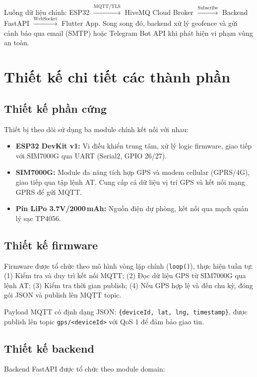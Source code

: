 \documentclass[../DoAn.tex]{subfiles}
\begin{document}
Luồng dữ liệu chính: ESP32 $\xrightarrow{\text{MQTT/TLS}}$ HiveMQ Cloud Broker $\xrightarrow{\text{Subscribe}}$ Backend FastAPI $\xrightarrow{\text{WebSocket}}$ Flutter App. Song song đó, backend xử lý geofence và gửi cảnh báo qua email (SMTP) hoặc Telegram Bot API khi phát hiện vi phạm vùng an toàn.

\section{Thiết kế chi tiết các thành phần}

\subsection{Thiết kế phần cứng}

Thiết bị theo dõi sử dụng ba module chính kết nối với nhau:

\begin{itemize}
  \item \textbf{ESP32 DevKit v1:} Vi điều khiển trung tâm, xử lý logic firmware, giao tiếp với SIM7000G qua UART (Serial2, GPIO 26/27).
  \item \textbf{SIM7000G:} Module đa năng tích hợp GPS và modem cellular (GPRS/4G), giao tiếp qua tập lệnh AT. Cung cấp cả dữ liệu vị trí GPS và kết nối mạng GPRS để gửi MQTT.
  \item \textbf{Pin LiPo 3.7V/2000\,mAh:} Nguồn điện dự phòng, kết nối qua mạch quản lý sạc TP4056.
\end{itemize}

\subsection{Thiết kế firmware}

Firmware được tổ chức theo mô hình vòng lặp chính (\texttt{loop()}), thực hiện tuần tự: (1) Kiểm tra và duy trì kết nối MQTT; (2) Đọc dữ liệu GPS từ SIM7000G qua lệnh AT; (3) Kiểm tra thời gian publish; (4) Nếu GPS hợp lệ và đến chu kỳ, đóng gói JSON và publish lên MQTT topic.

Payload MQTT có định dạng JSON: \texttt{\{deviceId, lat, lng, timestamp\}}, được publish lên topic \texttt{gps/<deviceId>} với QoS 1 để đảm bảo giao tin.

\subsection{Thiết kế backend}

Backend FastAPI được tổ chức theo module domain:
\end{document}
